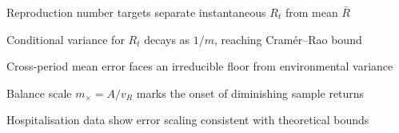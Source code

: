 \begin{highlights}
  \item Reproduction number targets separate instantaneous $R_t$ from mean $\bar{R}$
  \item Conditional variance for $R_t$ decays as $1/m$, reaching Cram\'er--Rao bound
  \item Cross-period mean error faces an irreducible floor from environmental variance
  \item Balance scale $m_\times = A/v_R$ marks the onset of diminishing sample returns
  \item Hospitalisation data show error scaling consistent with theoretical bounds
\end{highlights}
